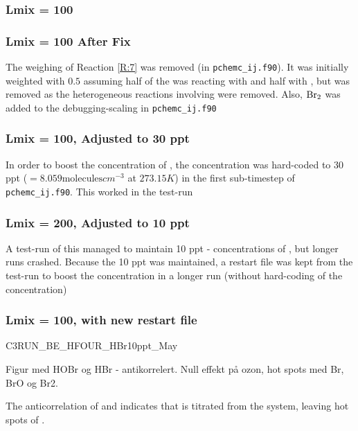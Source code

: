 \subsubsection{Lmix = 100}

\subsubsection{Lmix = 100 After Fix}

The weighing of Reaction \ref{R:7} was removed (in \texttt{pchemc\_ij.f90}). It was initially weighted with $0.5$ assuming half of the  was reacting with  and half with , but was removed as the heterogeneous reactions involving  were removed. Also, $\mathrm{Br_2}$ was added to the debugging-scaling in \texttt{pchemc\_ij.f90}

\subsubsection{Lmix = 100,  Adjusted to 30 ppt}

In order to boost the concentration of , the concentration was hard-coded to 30 ppt ($= 8.059 \text{molecules}cm^{-3}$ at $273.15 K$) in the first sub-timestep of \texttt{pchemc\_ij.f90}. This worked in the test-run


\subsubsection{Lmix = 200,  Adjusted to 10 ppt}

A test-run of this managed to maintain 10 ppt - concentrations of , but longer runs crashed. Because the 10 ppt was maintained, a restart file was kept from the test-run to boost the concentration in a longer run (without hard-coding of the  concentration)


\subsubsection{Lmix = 100, with new restart file}

C3RUN\_BE\_HFOUR\_HBr10ppt\_May

Figur med HOBr og HBr - antikorrelert. Null effekt på ozon, hot spots med Br, BrO og Br2. 

The anticorrelation of  and  indicates that  is titrated from the system, leaving hot spots of . 

